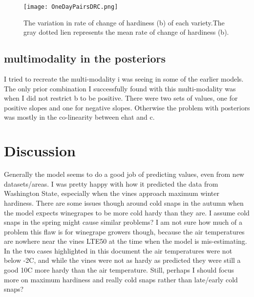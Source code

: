 \documentclass[11pt,letter]{article}
\begin{document}
\begin{figure}
  \texttt{[image: OneDayPairsDRC.png]}
  \caption{The variation in rate of change of hardiness (b) of each variety.The gray dotted lien represents the mean rate of change of hardiness (b).}
  \label{fig:OneDayPairsDRC}
\end{figure}

\subsection{multimodality in the posteriors }
I tried to recreate the multi-modality i was seeing in some of the earlier models. The only prior combination I successfully found with this multi-modality was when I did not restrict b to be positive. There were two sets of values, one for positive slopes and one for negative slopes. Otherwise the problem with posteriors was mostly in the co-linearity between ehat and c.  




\section{Discussion}

Generally the model seems to do a good job of predicting values, even from new datasets/areas. I was pretty happy with how it predicted the data from Washington State, especially when the vines approach maximum winter hardiness. There are some issues though around cold snaps in the autumn when the model expects winegrapes to be more cold hardy than they are. I assume cold snaps in the spring might cause similar problems? I am not sure how much of a problem this flaw is for winegrape growers though, because the air temperatures are nowhere near the vines LTE50 at the time when the model is mis-estimating. In the two cases highlighted in this document the air temperatures were not below -2\textdegree C, and while the vines were not as hardy as predicted they were still a good 10\textdegree C more hardy than the air temperature. Still, perhaps I should focus more on maximum hardiness and really cold snaps rather than late/early cold snaps? \\
\end{document}
